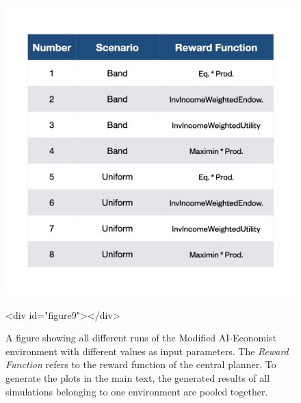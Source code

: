 \documentclass{article}
\begin{document}
\begin{figure}[h!]
\centering
\includegraphics[width=0.7\linewidth]{"A_Multi-agent_Reinforcement_Learning_Study_of_Emergence_of_Social_Classes_out_of_Arbitrary_Governance_The_Role_of_Environment_Slides_3/A_Multi-agent_Reinforcement_Learning_Study_of_Emergence_of_Social_Classes_out_of_Arbitrary_Governance_The_Role_of_Environment_Slides_3.001"}
\caption{A figure showing all different runs of the Modified AI-Economist environment with different values as input parameters. The \textit{Reward Function} refers to the reward function of the central planner. To generate the plots in the main text, the generated results of all simulations belonging to one environment are pooled together.}
<div id="figure9"></div>

\end{figure}

\newpage
\end{document}
